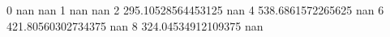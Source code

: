 0 nan nan
1 nan nan
2 295.10528564453125 nan
4 538.6861572265625 nan
6 421.80560302734375 nan
8 324.04534912109375 nan
